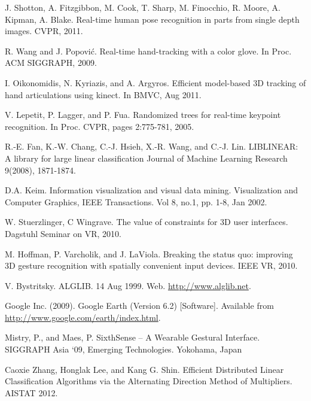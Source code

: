 \documentclass[letterpaper,twocolumn,10pt]{article}
\newcommand{\cutsection}{\vspace*{-0.20in}}%
\begin{document}
\cutsection

\cutsection

\cutsection

\cutsection

\cutsection

\cutsection

\cutsection

\cutsection

\cutsection

\cutsection

\begin{thebibliography}{9}
\cutsection
{} J. Shotton, A. Fitzgibbon, M. Cook, T. Sharp, M. Finocchio, R. Moore, A. Kipman, A. Blake. Real-time human pose recognition in parts from single depth images. CVPR, 2011.

 R. Wang and J. Popovi\'c. Real-time hand-tracking with a color glove. In Proc. ACM SIGGRAPH, 2009.

 I. Oikonomidis, N. Kyriazis, and A. Argyros. Efficient model-based 3D tracking of hand articulations using kinect. In BMVC, Aug 2011.

 V. Lepetit, P. Lagger, and P. Fua. Randomized trees for real-time keypoint recognition. In Proc. CVPR, pages 2:775-781, 2005. 

 R.-E. Fan, K.-W. Chang, C.-J. Hsieh, X.-R. Wang, and C.-J. Lin. LIBLINEAR: A library for large linear classification Journal of Machine Learning Research 9(2008), 1871-1874.

 D.A. Keim. Information visualization and visual data mining. Visualization and Computer Graphics, IEEE Transactions. Vol 8, no.1, pp. 1-8, Jan 2002.

 W. Stuerzlinger, C Wingrave. The value of constraints for 3D user interfaces. Dagstuhl Seminar on VR, 2010.

 M. Hoffman, P. Varcholik, and J. LaViola. Breaking the status quo: improving 3D gesture recognition with spatially convenient input devices. IEEE VR, 2010.

 V. Bystritsky. ALGLIB. 14 Aug 1999. Web. \url{http://www.alglib.net}.

 Google Inc. (2009). Google Earth (Version 6.2) [Software]. Available from \url{http://www.google.com/earth/index.html}.

 Mistry, P., and Maes, P. SixthSense – A Wearable Gestural Interface. SIGGRAPH Asia ‘09, Emerging Technologies. Yokohama, Japan

 Caoxie Zhang, Honglak Lee, and Kang G. Shin.  Efficient Distributed Linear Classification Algorithms via the Alternating Direction Method of Multipliers. AISTAT 2012.

\end{thebibliography}
\end{document}
